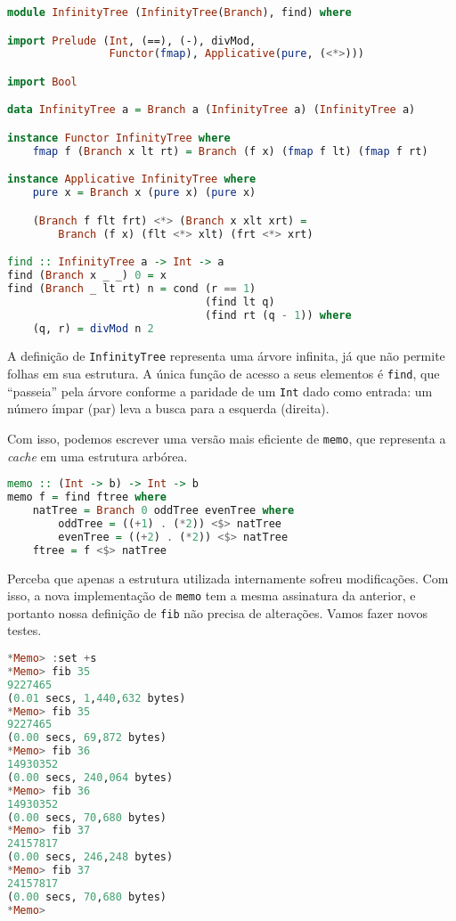 \documentclass[a4paper]{article}
\begin{document}
\begin{lstlisting}[language=haskell, frame=single]
module InfinityTree (InfinityTree(Branch), find) where

import Prelude (Int, (==), (-), divMod,
                Functor(fmap), Applicative(pure, (<*>)))

import Bool

data InfinityTree a = Branch a (InfinityTree a) (InfinityTree a)

instance Functor InfinityTree where
	fmap f (Branch x lt rt) = Branch (f x) (fmap f lt) (fmap f rt)

instance Applicative InfinityTree where
	pure x = Branch x (pure x) (pure x)

	(Branch f flt frt) <*> (Branch x xlt xrt) =
		Branch (f x) (flt <*> xlt) (frt <*> xrt)

find :: InfinityTree a -> Int -> a
find (Branch x _ _) 0 = x
find (Branch _ lt rt) n = cond (r == 1)
                               (find lt q)
                               (find rt (q - 1)) where
    (q, r) = divMod n 2
\end{lstlisting}

A definição de \texttt{InfinityTree} representa uma árvore infinita, já que não permite folhas em sua estrutura.
A única função de acesso a seus elementos é \texttt{find}, que ``passeia'' pela árvore conforme a paridade de um \texttt{Int} dado como entrada:
um número ímpar (par) leva a busca para a esquerda (direita).

Com isso, podemos escrever uma versão mais eficiente de \texttt{memo}, que representa a \emph{cache} em uma estrutura arbórea.

\begin{lstlisting}[language=haskell, frame=single]
memo :: (Int -> b) -> Int -> b
memo f = find ftree where
	natTree = Branch 0 oddTree evenTree where
		oddTree = ((+1) . (*2)) <$> natTree
		evenTree = ((+2) . (*2)) <$> natTree
	ftree = f <$> natTree
\end{lstlisting}

Perceba que apenas a estrutura utilizada internamente sofreu modificações.
Com isso, a nova implementação de \texttt{memo} tem a mesma assinatura da anterior, e portanto nossa definição de \texttt{fib} não precisa de alterações.
Vamos fazer novos testes.

\pagebreak

\begin{lstlisting}[language=haskell, frame=single]
*Memo> :set +s
*Memo> fib 35
9227465
(0.01 secs, 1,440,632 bytes)
*Memo> fib 35
9227465
(0.00 secs, 69,872 bytes)
*Memo> fib 36
14930352
(0.00 secs, 240,064 bytes)
*Memo> fib 36
14930352
(0.00 secs, 70,680 bytes)
*Memo> fib 37
24157817
(0.00 secs, 246,248 bytes)
*Memo> fib 37
24157817
(0.00 secs, 70,680 bytes)
*Memo>
\end{lstlisting}
\end{document}
